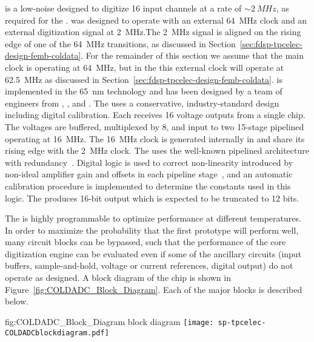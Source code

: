  is a low-noise   designed to digitize
\num{16} input channels at a rate of $\sim\SI{2}{MHz}$, as required for the
 .  was designed to operate with 
an external \SI{64}{MHz} clock and an external digitization signal at
\SI{2}{MHz}.The \SI{2}{MHz} signal is aligned on the rising edge of one of
the \SI{64}{MHz} transitions, as discussed in Section~\ref{sec:fdsp-tpcelec-design-femb-coldata}.
For the remainder of this section we assume that the main clock is operating
at \SI{64}{MHz}, but in the   this external clock will operate at \SI{62.5}{MHz}
as discussed in Section~\ref{sec:fdsp-tpcelec-design-femb-coldata}. 
 is implemented in the 
\SI{65}{nm}  technology and has been designed by a team of engineers
from , , and .  The  uses a conservative,
industry-standard design including digital calibration.  Each 
receives \num{16} voltage outputs from a single  chip.  The voltages
are buffered, multiplexed by \num{8}, and input to two \num{15}-stage pipelined 
operating at \SI{16}{MHz}. The \SI{16}{MHz} clock is generated internally in
 and share its rising edge with the \SI{2}{MHz} clock. 
The  uses the well-known pipelined architecture
with redundancy~\cite{PipelinedADC}.  Digital logic is used to correct non-linearity
introduced by non-ideal amplifier gain and offsets in each pipeline
stage~\cite{CalibrationCorrection}, and an automatic calibration procedure is
implemented to determine the constants used in this logic.  The  produces
\num{16}-bit output which is expected to be truncated to \num{12} bits.

The  is highly programmable to optimize performance at different
temperatures.  In order to maximize the probability that the first prototype
 will perform well, many circuit blocks can be bypassed, such
that the performance of the core digitization engine can be evaluated even
if some of the ancillary circuits (input buffers, sample-and-hold, voltage or current 
references, digital output) do not operate as designed. A block
diagram of the chip is shown in Figure~\ref{fig:COLDADC_Block_Diagram}. Each of
the major blocks is described below.

\begin{dunefigure}
{fig:COLDADC_Block_Diagram}
{ block diagram}
\texttt{[image: sp-tpcelec-COLDADCblockdiagram.pdf]}
\end{dunefigure}

